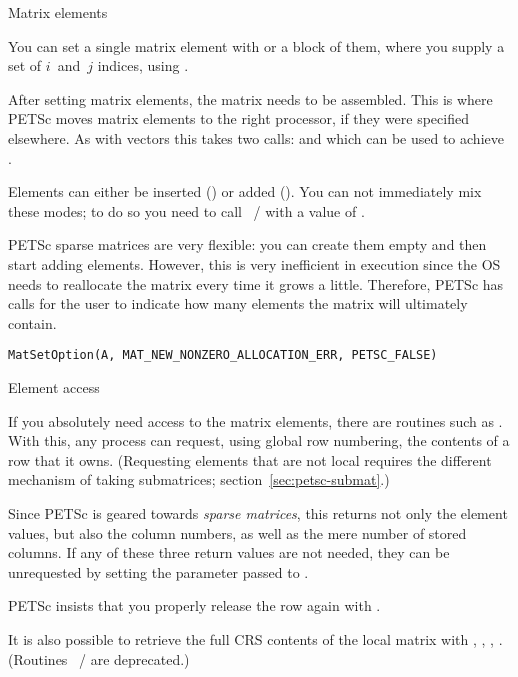  {Matrix elements}

You can set a single matrix element with
%
%
or a block of them, where you
supply a set of $i$~and~$j$ indices, using
%
. 

After setting matrix elements, the matrix needs to be assembled. This
is where PETSc moves matrix elements to the right processor, if they
were specified elsewhere. As with vectors this takes two calls:
%
and
%
which can be used to achieve .

Elements can either be inserted
() or added
().
You can not immediately mix these modes; to do so you need to call
~/ 
with a value of .

PETSc sparse matrices are very flexible: you can create them empty and
then start adding elements. However, this is very inefficient in
execution since the \ac{OS} needs to reallocate the matrix every time
it grows a little. Therefore, PETSc has calls for the user to indicate
how many elements the matrix will ultimately contain.
%
\begin{lstlisting}
MatSetOption(A, MAT_NEW_NONZERO_ALLOCATION_ERR, PETSC_FALSE)
\end{lstlisting}

 {Element access}

If you absolutely need access to the matrix elements, there are
routines such as 
.
With this, any process can request, using global row numbering,
the contents of a row that it owns.
(Requesting elements that are not local requires the
different mechanism of taking submatrices; section~\ref{sec:petsc-submat}.)

Since PETSc is geared towards
\emph{sparse matrices},
this returns not only the element values, but also the column numbers,
as well as the mere number of stored columns.
If any of these three return values are not needed, they can be
unrequested by setting the parameter passed to .

PETSc insists that you properly release the row again with
.

It is also possible to retrieve the full \ac{CRS} contents
of the local matrix with
,
,
,
.
(Routines ~/ 
are deprecated.)


